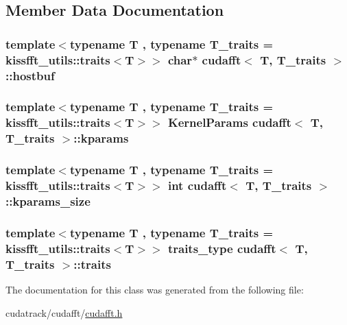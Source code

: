 \subsection{Member Data Documentation}
\subsubsection[{\texorpdfstring{hostbuf}{hostbuf}}]{\setlength{\rightskip}{0pt plus 5cm}template$<$typename T , typename T\+\_\+traits  = kissfft\+\_\+utils\+::traits$<$\+T$>$$>$ char$\ast$ {\bf cudafft}$<$ T, T\+\_\+traits $>$\+::hostbuf}\hypertarget{classcudafft_a1c3a0f46edfc7749218206948373136b}{}\label{classcudafft_a1c3a0f46edfc7749218206948373136b}
\subsubsection[{\texorpdfstring{kparams}{kparams}}]{\setlength{\rightskip}{0pt plus 5cm}template$<$typename T , typename T\+\_\+traits  = kissfft\+\_\+utils\+::traits$<$\+T$>$$>$ {\bf Kernel\+Params} {\bf cudafft}$<$ T, T\+\_\+traits $>$\+::kparams}\hypertarget{classcudafft_ac6c989cedd13030a91f4a92db894492d}{}\label{classcudafft_ac6c989cedd13030a91f4a92db894492d}
\subsubsection[{\texorpdfstring{kparams\+\_\+size}{kparams_size}}]{\setlength{\rightskip}{0pt plus 5cm}template$<$typename T , typename T\+\_\+traits  = kissfft\+\_\+utils\+::traits$<$\+T$>$$>$ int {\bf cudafft}$<$ T, T\+\_\+traits $>$\+::kparams\+\_\+size}\hypertarget{classcudafft_ab2818f49ade4d1628377b6d0539c47ab}{}\label{classcudafft_ab2818f49ade4d1628377b6d0539c47ab}
\subsubsection[{\texorpdfstring{traits}{traits}}]{\setlength{\rightskip}{0pt plus 5cm}template$<$typename T , typename T\+\_\+traits  = kissfft\+\_\+utils\+::traits$<$\+T$>$$>$ {\bf traits\+\_\+type} {\bf cudafft}$<$ T, T\+\_\+traits $>$\+::traits}\hypertarget{classcudafft_a8a9bd28623cdece7c8c5fa89917ad7a4}{}\label{classcudafft_a8a9bd28623cdece7c8c5fa89917ad7a4}


The documentation for this class was generated from the following file\+:\begin{DoxyCompactItemize}
\item 
cudatrack/cudafft/\hyperlink{cudafft_8h}{cudafft.\+h}\end{DoxyCompactItemize}
